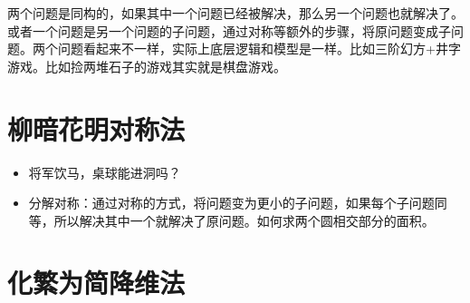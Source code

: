 \documentclass[export, 12pt, letterpaper]{ctexrep}
\begin{document}
两个问题是同构的，如果其中一个问题已经被解决，那么另一个问题也就解决了。或者一个问题是另一个问题的子问题，通过对称等额外的步骤，将原问题变成子问题。两个问题看起来不一样，实际上底层逻辑和模型是一样。比如三阶幻方+井字游戏。比如捡两堆石子的游戏其实就是棋盘游戏。


\section{柳暗花明对称法}

\begin{itemize}
\item{ 将军饮马，桌球能进洞吗？ }
\item{ 分解对称：通过对称的方式，将问题变为更小的子问题，如果每个子问题同等，所以解决其中一个就解决了原问题。如何求两个圆相交部分的面积。 }
\end{itemize}



\section{化繁为简降维法}
\end{document}
